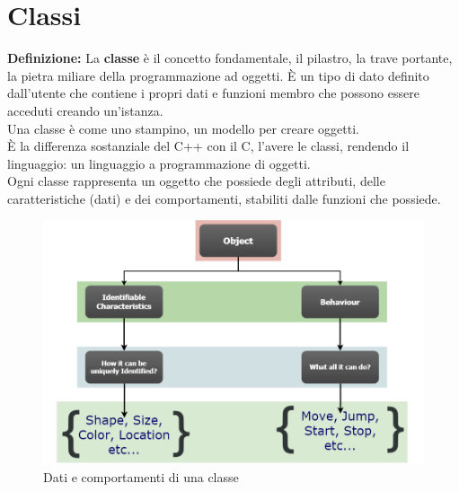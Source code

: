 
\newpage

\section{Classi}

\textsf{\small \textbf{Definizione: } La \textbf{classe} è il concetto fondamentale, il pilastro, la trave portante, la pietra miliare della programmazione ad oggetti. È un tipo di dato definito dall'utente che contiene i propri dati e funzioni membro che possono essere acceduti creando un'istanza.} \\ %

\textsf{\small Una classe è come uno stampino, un modello per creare oggetti. } \\

\textsf{\small È la differenza sostanziale del C++ con il C, l'avere le classi, rendendo il linguaggio: un linguaggio a programmazione di oggetti. } \\ %

\textsf{\small Ogni classe rappresenta un oggetto che possiede degli attributi, delle caratteristiche (dati) e dei comportamenti, stabiliti dalle funzioni che possiede. } \\

\begin{figure}[ht]
	\centering
	\includegraphics[width=1\textwidth, height=1\textheight, keepaspectratio]{./imgs/class_data_and_behaviour.png}
	\caption{Dati e comportamenti di una classe}
	\label{fig:class_data_and_behaviour}
\end{figure}

